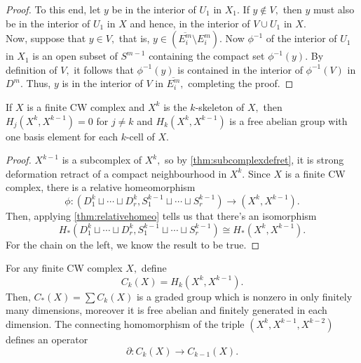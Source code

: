 \documentclass[12pt]{article}
\begin{document}
\begin{proof}
	To this end, let $y$ be in the interior of $U_1$ in $X_1.$ If $y \notin V,$ then $y$ must also be in the interior of $U_1$ in $X$ and hence, in the interior of $V \cup U_1$ in $X.$\\
	Now, suppose that $y \in V,$ that is, $y \in (\overline{E_i^m} \setminus E_i^m).$ Now $\phi^{-1}$ of the interior of $U_1$ in $X_1$ is an open subset of $S^{m-1}$ containing the compact set $\phi^{-1}(y).$ By definition of $V,$ it follows that $\phi^{-1}(y)$ is contained in the interior of $\phi^{-1}(V)$ in $D^m.$ Thus, $y$ is in the interior of $V$ in $\overline{E_i^m},$ completing the proof.
\end{proof}

\begin{thm} \label{thm:220}
	If $X$ is a finite CW complex and $X^k$ is the $k$-skeleton of $X,$ then $H_j(X^k, X^{k-1}) = 0$ for $j \neq k$ and $H_k(X^k, X^{k-1})$ is a free abelian group with one basis element for each $k$-cell of $X.$
\end{thm}
\begin{proof} 
	$X^{k-1}$ is a subcomplex of $X^k,$ so by \cref{thm:subcomplexdefret}, it is strong deformation retract of a compact neighbourhood in $X^k.$ Since $X$ is a finite CW complex, there is a relative homeomorphism
	\begin{equation*} 
		\phi:(D_1^k \sqcup \cdots \sqcup D_r^k, S_1^{k-1} \sqcup \cdots \sqcup S_r^{k-1}) \to (X^k, X^{k-1}).
	\end{equation*}
	Then, applying \cref{thm:relativehomeo} tells us that there's an isomorphism
	\begin{equation*} 
		H_*(D_1^k \sqcup \cdots \sqcup D_r^k, S_1^{k-1} \sqcup \cdots \sqcup S_r^{k-1}) \cong H_*(X^k, X^{k-1}).
	\end{equation*}
	For the chain on the left, we know the result to be true.
\end{proof}

\begin{defn}
	For any finite CW complex $X,$ define
	\begin{equation*} 
		C_k(X) = H_k(X^k, X^{k-1}).
	\end{equation*}
	Then, $C_*(X) = \sum C_k(X)$ is a graded group which is nonzero in only finitely many dimensions, moreover it is free abelian and finitely generated in each dimension. The connecting homomorphism of the triple $(X^k, X^{k-1}, X^{k-2})$ defines an operator
	\begin{equation*} 
		\partial:C_k(X) \to C_{k-1}(X).
	\end{equation*}		
\end{defn}
\end{document}
